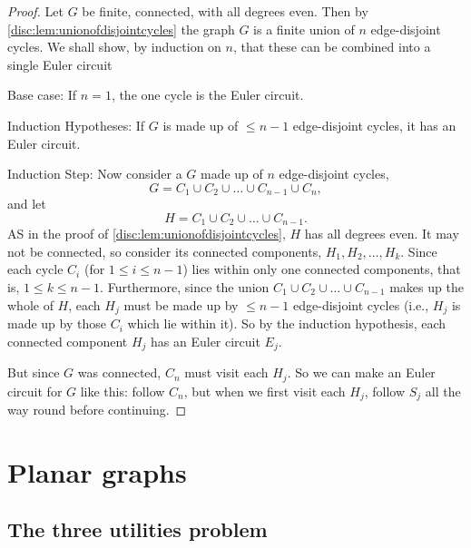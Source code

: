 \documentclass[10pt, a4paper]{article}
\begin{document}
\begin{proof}
    Let $G$ be finite,
    connected,
    with all degrees even.
    Then by \autoref{disc:lem:unionofdisjointcycles} the graph $G$ is a finite union of $n$ edge-disjoint cycles.
    We shall show,
    by induction on $n$,
    that these can be combined into a single Euler circuit

    Base case:
    If $n = 1$,
    the one cycle is the Euler circuit.

    Induction Hypotheses:
    If $G$ is made up of $\leq n - 1$ edge-disjoint cycles,
    it has an Euler circuit.

    Induction Step:
    Now consider a $G$ made up of $n$ edge-disjoint cycles,
    \[
    G = C_1 \cup C_2 \cup \dotsc \cup C_{n - 1} \cup C_n,
    \]
    and let
    \[
    H = C_1 \cup C_2 \cup \dotsc \cup C_{n - 1}.
    \]
    AS in the proof of \autoref{disc:lem:unionofdisjointcycles},
    $H$ has all degrees even.
    It may not be connected,
    so consider its connected components,
    $H_1, H_2, \dotsc, H_k$.
    Since each cycle $C_i$
    (for $1 \leq i \leq n - 1$)
    lies within only one connected components,
    that is,
    $1 \leq k \leq n - 1$.
    Furthermore,
    since the union $C_1 \cup C_2 \cup \dotsc \cup C_{n - 1}$ makes up the whole of $H$,
    each $H_j$ must be made up by $\leq n - 1$ edge-disjoint cycles
    (i.e.,
    $H_j$ is made up by those $C_i$ which lie within it).
    So by the induction hypothesis,
    each connected component $H_j$ has an Euler circuit $E_j$.

    But since $G$ was connected,
    $C_n$ must visit each $H_j$.
    So we can make an Euler circuit for $G$ like this:
    follow $C_n$,
    but when we first visit each $H_j$,
    follow $S_j$ all the way round before continuing.
\end{proof}

\newpage

\section{Planar graphs}

\subsection{The three utilities problem}
\end{document}
